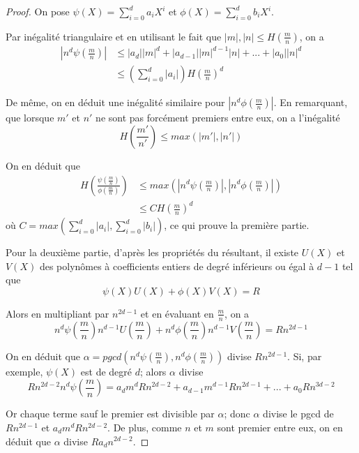 \documentclass{article}
\begin{document}
\begin{proof}
On pose $\psi(X)=\sum_{i=0}^{d}{a_{i}X^i}$ et $\phi(X)=\sum_{i=0}^{d}{b_{i}X^i}$.

Par inégalité triangulaire et en utilisant le fait que $|m|,|n| \leq H(\frac{m}{n})$, on a
\begin{align*}
|n^d\psi(\frac{m}{n})| &\leq |a_{d}||m|^d + |a_{d-1}||m|^{d-1}|n| + ... + |a_{0}||n|^d \\
					   &\leq (\sum_{i=0}^{d}{|a_{i}|})H(\frac{m}{n})^d
\end{align*}

De même, on en déduit une inégalité similaire pour $|n^d\phi(\frac{m}{n})|$. 
En remarquant, que lorsque $m'$ et $n'$ ne sont pas forcément premiers entre eux,
on a l'inégalité 
$$H(\frac{m'}{n'}) \leq max(|m'|, |n'|)$$

On en déduit que
\begin{align*}
H(\frac{\psi(\frac{m}{n})}{\phi(\frac{m}{n})}) &\leq max(|n^d\psi(\frac{m}{n})|, |n^d\phi(\frac{m}{n})|) \\
	&\leq C H(\frac{m}{n})^d
\end{align*}
où $C=max(\sum_{i=0}^{d}{|a_{i}|},\sum_{i=0}^{d}{|b_{i}|})$, ce qui prouve la première partie.

Pour la deuxième partie, d'après les propriétés du résultant, il existe $U(X)$ et $V(X)$ des polynômes
à coefficients entiers de degré inférieurs ou égal à $d-1$ tel que
\begin{equation*}
\psi(X)U(X) + \phi(X)V(X) = R
\end{equation*}

Alors en multipliant par $n^{2d-1}$ et en évaluant en $\frac{m}{n}$, on a
\begin{equation}
\label{h1}
n^d\psi(\frac{m}{n})n^{d-1}U(\frac{m}{n}) + n^d\phi(\frac{m}{n})n^{d-1}V(\frac{m}{n}) = R n^{2d-1}
\end{equation}

On en déduit que $\alpha=pgcd(n^d\psi(\frac{m}{n}), n^d\phi(\frac{m}{n}))$ divise $R n^{2d-1}$. Si, par
exemple, $\psi(X)$ est de degré $d$; alors $\alpha$ divise
\begin{equation*}
Rn^{2d-2}n^d\psi(\frac{m}{n}) = a_{d}m^dRn^{2d-2} + a_{d-1}m^{d-1}Rn^{2d-1} + ... + a_{0}Rn^{3d-2}
\end{equation*}

Or chaque terme sauf le premier est divisible par $\alpha$; donc $\alpha$ divise 
le pgcd de $Rn^{2d-1}$ et $a_{d}m^{d}Rn^{2d-2}$. De plus, comme $n$ et $m$ sont premier entre eux, on en déduit
que $\alpha$ divise $Ra_{d}n^{2d-2}$.


\end{proof}
\end{document}
